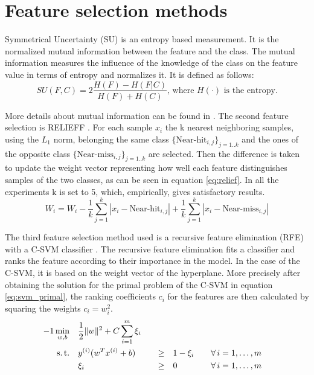 \documentclass[twoside,11pt]{article}
\begin{document}
\section{Feature selection methods}

Symmetrical Uncertainty (SU) \citep{press1996numerical} is an entropy based measurement. It is the normalized mutual information between the feature and the class. The mutual information measures the influence of the knowledge of the class on the feature value in terms of entropy and normalizes it. It is defined as follows:
\begin{equation}
  \label{eq:su}
  SU(F,C) = 2 \frac{H(F) - H(F|C)}{H(F) + H(C)} \textrm{, where } H(\cdot) \textrm{ is the entropy.}
\end{equation}

More details about mutual information can be found in \cite{paninski2003estimation}. The second feature selection is RELIEFF \citep{kononenko1997overcoming}. For each sample $x_i$ the k nearest neighboring samples, using the $L_1$ norm, belonging the same class $\{\textrm{Near-hit}_{i, j}\}_{j=1..k}$ and the ones of the opposite class $\{\textrm{Near-miss}_{i, j}\}_{j=1..k}$ are selected. Then the difference is taken to update the weight vector representing how well each feature distinguishes samples of the two classes, as can be seen in equation \ref{eq:relief}. In all the experiments k is set to 5, which, empirically, gives satisfactory results.
\begin{equation}
  \label{eq:relief}
  W_i = W_i - \frac{1}{k}\sum_{j=1}^{k}|x_i - \textrm{Near-hit}_{i,j}| + \frac{1}{k}\sum_{j=1}^{k} |x_i - \textrm{Near-miss}_{i,j}|
\end{equation}

The third feature selection method used is a recursive feature elimination (RFE) with a C-SVM classifier \citep{guyon2002gene}. 
The recursive feature elimination fits a classifier and ranks the feature according to their importance in the model. In the case of the C-SVM, it is based on the weight vector of the hyperplane. More precisely after obtaining the solution for the primal problem of the C-SVM in equation \ref{eq:svm_primal}, the ranking coefficients $c_i$ for the features are then calculated by squaring the weights $c_i = w_i^2$.
\begin{alignat}{-1}
     \min_{w,b}  & \quad \frac12\|w\|^2 + C\sum_{i=1}^m \xi_i & & & \label{eq:svm_primal} \\ 
   \text{s.\,t.} & \quad y^{(i)} (w^Tx^{(i)} + b) & \quad \geq & \quad 1 -\xi_i &&
                   \quad \forall \, i = 1, \ldots, m \nonumber \\
                 & \quad \xi_i                  & \quad \geq & \quad 0 &&
                   \quad \forall \, i = 1, \ldots, m \nonumber 
\end{alignat}
\end{document}
